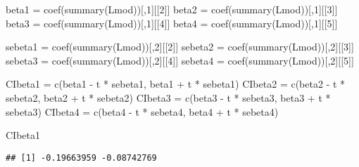 \documentclass[
]{article}
\newenvironment{Shaded}{\begin{snugshade}}{\end{snugshade}}
\newcommand{\DecValTok}[1]{\textcolor[rgb]{0.00,0.00,0.81}{#1}}
\newcommand{\FunctionTok}[1]{\textcolor[rgb]{0.00,0.00,0.00}{#1}}
\newcommand{\NormalTok}[1]{#1}
\newcommand{\OtherTok}[1]{\textcolor[rgb]{0.56,0.35,0.01}{#1}}
\newcommand{\SpecialCharTok}[1]{\textcolor[rgb]{0.00,0.00,0.00}{#1}}
\begin{document}
\begin{Shaded}
\begin{Highlighting}[]
\NormalTok{beta1 }\OtherTok{=} \FunctionTok{coef}\NormalTok{(}\FunctionTok{summary}\NormalTok{(Lmod))[,}\DecValTok{1}\NormalTok{][[}\DecValTok{2}\NormalTok{]]}
\NormalTok{beta2 }\OtherTok{=} \FunctionTok{coef}\NormalTok{(}\FunctionTok{summary}\NormalTok{(Lmod))[,}\DecValTok{1}\NormalTok{][[}\DecValTok{3}\NormalTok{]]}
\NormalTok{beta3 }\OtherTok{=} \FunctionTok{coef}\NormalTok{(}\FunctionTok{summary}\NormalTok{(Lmod))[,}\DecValTok{1}\NormalTok{][[}\DecValTok{4}\NormalTok{]]}
\NormalTok{beta4 }\OtherTok{=} \FunctionTok{coef}\NormalTok{(}\FunctionTok{summary}\NormalTok{(Lmod))[,}\DecValTok{1}\NormalTok{][[}\DecValTok{5}\NormalTok{]]}

\NormalTok{sebeta1 }\OtherTok{=} \FunctionTok{coef}\NormalTok{(}\FunctionTok{summary}\NormalTok{(Lmod))[,}\DecValTok{2}\NormalTok{][[}\DecValTok{2}\NormalTok{]]}
\NormalTok{sebeta2 }\OtherTok{=} \FunctionTok{coef}\NormalTok{(}\FunctionTok{summary}\NormalTok{(Lmod))[,}\DecValTok{2}\NormalTok{][[}\DecValTok{3}\NormalTok{]]}
\NormalTok{sebeta3 }\OtherTok{=} \FunctionTok{coef}\NormalTok{(}\FunctionTok{summary}\NormalTok{(Lmod))[,}\DecValTok{2}\NormalTok{][[}\DecValTok{4}\NormalTok{]]}
\NormalTok{sebeta4 }\OtherTok{=} \FunctionTok{coef}\NormalTok{(}\FunctionTok{summary}\NormalTok{(Lmod))[,}\DecValTok{2}\NormalTok{][[}\DecValTok{5}\NormalTok{]]}


\NormalTok{CIbeta1 }\OtherTok{=} \FunctionTok{c}\NormalTok{(beta1 }\SpecialCharTok{{-}}\NormalTok{ t }\SpecialCharTok{*}\NormalTok{ sebeta1, beta1 }\SpecialCharTok{+}\NormalTok{ t }\SpecialCharTok{*}\NormalTok{ sebeta1)}
\NormalTok{CIbeta2 }\OtherTok{=} \FunctionTok{c}\NormalTok{(beta2 }\SpecialCharTok{{-}}\NormalTok{ t }\SpecialCharTok{*}\NormalTok{ sebeta2, beta2 }\SpecialCharTok{+}\NormalTok{ t }\SpecialCharTok{*}\NormalTok{ sebeta2)}
\NormalTok{CIbeta3 }\OtherTok{=} \FunctionTok{c}\NormalTok{(beta3 }\SpecialCharTok{{-}}\NormalTok{ t }\SpecialCharTok{*}\NormalTok{ sebeta3, beta3 }\SpecialCharTok{+}\NormalTok{ t }\SpecialCharTok{*}\NormalTok{ sebeta3)}
\NormalTok{CIbeta4 }\OtherTok{=} \FunctionTok{c}\NormalTok{(beta4 }\SpecialCharTok{{-}}\NormalTok{ t }\SpecialCharTok{*}\NormalTok{ sebeta4, beta4 }\SpecialCharTok{+}\NormalTok{ t }\SpecialCharTok{*}\NormalTok{ sebeta4)}


\NormalTok{CIbeta1}
\end{Highlighting}
\end{Shaded}

\begin{verbatim}
## [1] -0.19663959 -0.08742769
\end{verbatim}
\end{document}
